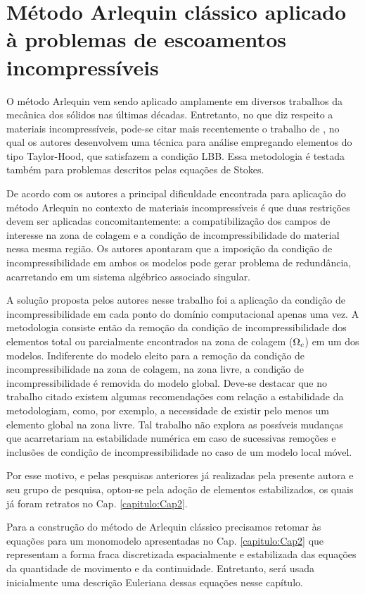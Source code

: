 \documentclass[tese_patricia]{subfiles}
\begin{document}
\section{Método Arlequin clássico aplicado à problemas de escoamentos incompressíveis}

O método Arlequin vem sendo aplicado amplamente em diversos trabalhos da mecânica dos sólidos nas últimas décadas. Entretanto, no que diz respeito a materiais incompressíveis, pode-se citar mais recentemente o trabalho de , no qual os autores desenvolvem uma técnica para análise empregando elementos do tipo Taylor-Hood, que satisfazem a condição LBB. Essa metodologia é testada também para problemas descritos pelas equações de Stokes.

De acordo com os autores  a principal dificuldade encontrada para aplicação do método Arlequin no contexto de materiais incompressíveis é que duas restrições devem ser aplicadas concomitantemente: a compatibilização dos campos de interesse na zona de colagem e a condição de incompressibilidade do material nessa mesma região. Os autores apontaram que a imposição da condição de incompressibilidade em ambos os modelos pode gerar problema de redundância, acarretando em um sistema algébrico associado singular.

A solução proposta pelos autores nesse trabalho foi a aplicação da condição de incompressibilidade em cada ponto do domínio computacional apenas uma vez. A metodologia consiste então da remoção da condição de incompressibilidade dos elementos total ou parcialmente encontrados na zona de colagem ($\Omega_c$) em um dos modelos. Indiferente do modelo eleito para a remoção da condição de incompressibilidade na zona de colagem, na zona livre, a condição de incompressibilidade é removida do modelo global. Deve-se destacar que no trabalho citado existem algumas recomendações com relação a estabilidade da metodologiam, como, por exemplo, a necessidade de existir pelo menos um elemento global na zona livre. Tal trabalho não explora as possíveis mudanças que acarretariam na estabilidade numérica em caso de sucessivas remoções e inclusões de condição de incompressibilidade no caso de um modelo local móvel.

Por esse motivo, e pelas pesquisas anteriores já realizadas pela presente autora e seu grupo de pesquisa, optou-se pela adoção de elementos estabilizados, os quais já foram retratos no Cap. \ref{capitulo:Cap2}.

Para a construção do método de Arlequin clássico precisamos retomar às equações para um monomodelo apresentadas no Cap. \ref{capitulo:Cap2} que representam a forma fraca discretizada espacialmente e estabilizada das equações da quantidade de movimento e da continuidade. Entretanto, será usada inicialmente uma descrição Euleriana dessas equações nesse capítulo.
\end{document}
